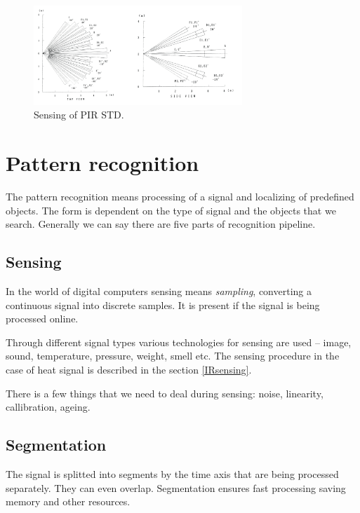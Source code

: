 \begin{figure}[h!]
\begin{center}
\includegraphics[width=0.7\textwidth]{obrazky-figures/roomsegments.png}
\caption{Sensing of PIR STD. \cite{PIROperationalManual}\label{fig:roomsegments}}
\end{center}    
\end{figure}



\newpage
\section{Pattern recognition}
The pattern recognition means processing of a signal and localizing of predefined objects.
The form is dependent on the type of signal and the objects that we search. Generally we can say
there are five parts of recognition pipeline.

\subsection*{Sensing}
In the world of digital computers sensing means {\it sampling}, converting a continuous signal
into discrete samples. It is present if the signal is being processed online.

Through different signal types various technologies for sensing are used -- image, sound, temperature,
pressure, weight, smell etc. The sensing procedure in the case of heat signal is described in the section
\ref{IRsensing}.

There is a few things that we need to deal during sensing: noise, linearity, callibration, ageing.

\subsection*{Segmentation}
The signal is splitted into segments by the time axis that are being processed separately. They can even overlap.
Segmentation ensures fast processing saving memory and other resources.


